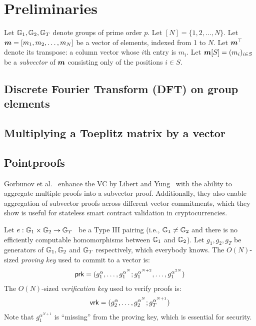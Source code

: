\section{Preliminaries}

Let $\mathbb{G}_1, \mathbb{G}_2, \mathbb{G}_T$ denote groups of prime order $p$.
Let $[N] = \{1,2,\dots, N\}$.
Let $\bm{m}=[m_1, m_2, \dots, m_N]$ be a vector of elements, indexed from 1 to $N$.
Let $\bm{m}^\top$ denote its transpose: a column vector whose $i$th entry is $m_i$.
Let $\bm{m}[S] = (m_i)_{i \in S}$ be a \textit{subvector} of $\bm{m}$ consisting only of the positions $i\in S$.

\subsection{Discrete Fourier Transform (DFT) on group elements}
\label{s:dft}

\subsection{Multiplying a Toeplitz matrix by a vector}
\label{s:toeplitz}

\subsection{Pointproofs}
\label{s:pointproofs}

Gorbunov et al.~\cite{GRWZ20} enhance the VC by Libert and Yung~\cite{LY10} with the ability to aggregate multiple proofs into a subvector proof.
Additionally, they also enable aggregation of subvector proofs across different vector commitments, which they show is useful for stateless smart contract validation in cryptocurrencies.

Let $e : \mathbb{G}_1 \times \mathbb{G}_2\rightarrow \mathbb{G}_T$~\cite{GPS08} be a Type III pairing (i.e., $\mathbb{G}_1\ne \mathbb{G}_2$ and there is no efficiently computable homomorphisms between $\mathbb{G}_1$ and $\mathbb{G}_2$).
Let $g_1,g_2,g_T$ be generators of $\mathbb{G}_1, \mathbb{G}_2$ and $\mathbb{G}_T$ respectively, which everybody knows.
The $O(N)$-sized \textit{proving key} used to commit to a vector is:
\begin{align}
    \mathsf{prk} = (g_1^{\alpha},\dots, g_1^{\alpha^N}; g_1^{\alpha^{N+2}},\dots, g_1^{\alpha^{2N}})
\end{align}
The $O(N)$-sized \textit{verification key} used to verify proofs is:
\begin{align}
    \mathsf{vrk} = (g_2^{\alpha},\dots,g_2^{\alpha^N}; g_T^{\alpha^{N+1}})
\end{align}
Note that $g_1^{\alpha^{N+1}}$ is ``missing'' from the proving key, which is essential for security.

